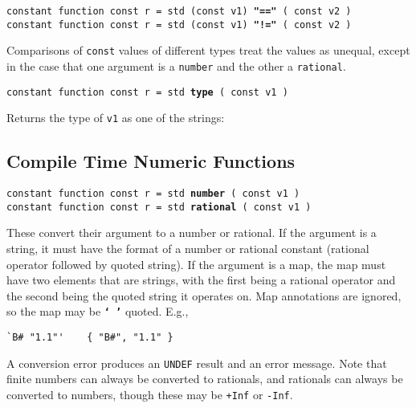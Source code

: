 \documentclass[12pt]{article}
\newcommand{\TT}[1]{{\tt \bfseries #1}}
\newcommand{\ttkey}[1]{{\tt \bfseries #1}}
\newenvironment{indpar}[1][0.3in]%
	{\begin{list}{}%
		     {\setlength{\itemsep}{0in}%
		      \setlength{\topsep}{0in}%
		      \setlength{\parsep}{1ex}%
		      \setlength{\labelwidth}{#1}%
		      \setlength{\leftmargin}{#1}%
		      \addtolength{\leftmargin}{\labelsep}}%
	 \item}%
	{\end{list}}
\begin{document}
{\tt constant function const r = std (const v1) \ttkey{"=="} ( const v2 )} \\
{\tt constant function const r = std (const v1) \ttkey{"!="} ( const v2 )}
\begin{indpar}
Comparisons of {\tt const} values of different types treat
the values as unequal, except in the case that one argument is a {\tt number}
and the other a {\tt rational}.
\end{indpar}

{\tt constant function const r = std \ttkey{type} ( const v1 )}
\begin{indpar}
Returns the type of {\tt v1} as one of the strings: \\
\hspace*{0.5in}{\tt
"special" ~  "number" ~ "rational" ~ "string" ~ \tt "map"}
\end{indpar}


\subsection{Compile Time Numeric Functions}

{\tt constant function const r = std \ttkey{number} ( const v1 )} \\
{\tt constant function const r = std \ttkey{rational} ( const v1 )}
\begin{indpar}
These convert their argument to a number or rational.  If
the argument is a string, it must have the format of
a number or rational constant (rational operator followed
by quoted string).
If the argument is a map, the map must have two elements
that are strings, with the first being a rational operator
and the second being the quoted string it operates on.
Map annotations are ignored, so the map may be
\TT{`~'} quoted.  E.g.,
\begin{indpar}\begin{verbatim}
`B# "1.1"'    { "B#", "1.1" }
\end{verbatim}\end{indpar}


A conversion
error produces an {\tt UNDEF} result and an error message.
Note that finite numbers can always be converted to rationals,
and rationals can always be converted to numbers, though these
may be {\tt +Inf} or {\tt -Inf}.
\end{indpar}
\end{document}
